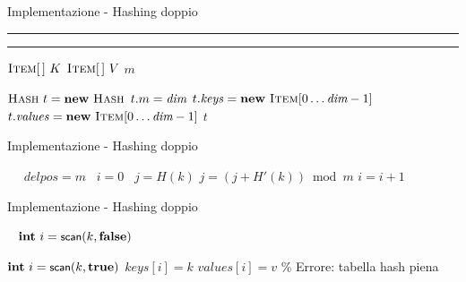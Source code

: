 \begin{frame}{Implementazione - Hashing doppio}


\vspace{-12pt}
\begin{Procedure}
\noindent\rule{\textwidth}{0.8pt}\hrulefill

\vspace{-15pt}
{\Hash}

\vspace{-9pt}
\noindent\rule{\textwidth}{0.8pt}\hrulefill

\vspace{-9pt}
$\textsc{Item}[\,]\ K$
$\textsc{Item}[\,]\ V$
\INTEGER $m$
\BlankLine

\PROCEDURE{\Hash \hashconstructor(\INTEGER $\hashsize$)}
{
  $\Hash\ t = \NEW\ \Hash$\;
  $t.m = \textit{dim}$\;
  $t.\mathit{keys} = \NEW\ \Item[0 \mldots \hashsize-1]$\;
  $t.\mathit{values} = \NEW\ \Item[0 \mldots \hashsize-1]$\;
  \Return $t$\;
}
\BlankLine

\end{Procedure}
\end{frame}
 
\begin{frame}{Implementazione - Hashing doppio}
\vspace{-12pt}
\begin{Procedure}
\INTEGER\ 
{
  \INTEGER\ $\mathit{delpos} = m$
  \INTEGER\ $i = 0$
  \INTEGER\ $j = H(k)$
  {
    $j = (j + H'(k)) \bmod m$\;
    $i = i+1$\; 
  }
}
\BlankLine

\end{Procedure}
\end{frame}
 
\begin{frame}{Implementazione - Hashing doppio}
\vspace{-12pt}
\begin{Procedure}

\Item\ 
{
  $\INTEGER\ i = \hashscan(k, \FALSE)$\;
}
\BlankLine

{
  $\INTEGER\ i = \hashscan(k, \TRUE)$\;
  {
    $\mathit{keys}[i] = k$\;
    $\mathit{values}[i] = v$\;
  }
  {
    \% Errore: tabella hash piena
  }
}
\end{Procedure}
\end{frame}
 
